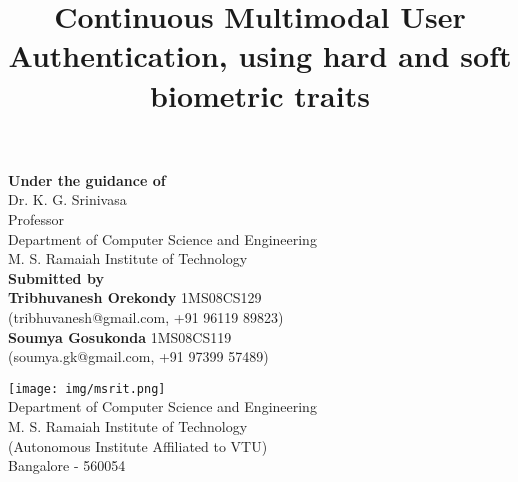 \documentclass[12pt]{article}			%
\title{Continuous Multimodal User Authentication, using hard and soft biometric traits}	%
\date{}				%
\begin{document}
\maketitle				%
\thispagestyle{empty}			%

\begin{center}

{\Large}

{\large}
{\bf Under the guidance of }{\bf}\\[2ex]
Dr. K. G. Srinivasa\\
Professor\\
Department of Computer Science and Engineering\\
M. S. Ramaiah Institute of Technology\\[3ex]


{\bf Submitted by}{\bf}\\[2ex]
{\bf Tribhuvanesh Orekondy }{\bf} 1MS08CS129\\
(tribhuvanesh@gmail.com, +91 96119 89823)\\[2ex]
{\bf Soumya Gosukonda }{\bf} 1MS08CS119\\
(soumya.gk@gmail.com, +91 97399 57489)\\[8ex]
{\large}

\texttt{[image: img/msrit.png]}\\
Department of Computer Science and Engineering\\
M. S. Ramaiah Institute of Technology\\
(Autonomous Institute Affiliated to VTU)\\
Bangalore - 560054
\end{center}

\newpage
\end{document}
